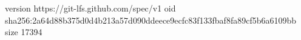 version https://git-lfs.github.com/spec/v1
oid sha256:2a64d88b375d0d4b213a57d090ddeece9ecfc83f133fbaf8fa89cf5b6a6109bb
size 17394
